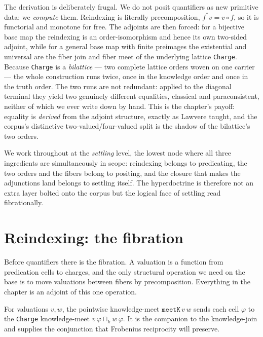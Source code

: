 The derivation is deliberately frugal. We do not posit quantifiers as new
primitive data; we \emph{compute} them. Reindexing is literally precomposition,
$f^{*}v = v \circ f$, so it is functorial and monotone for free. The adjoints are
then forced: for a bijective base map the reindexing is an order-isomorphism and
hence its own two-sided adjoint, while for a general base map with finite
preimages the existential and universal are the fiber join and fiber meet of the
underlying lattice \texttt{Charge}. Because \texttt{Charge} is a \emph{bilattice}
--- two complete lattice orders woven on one carrier --- the whole construction
runs twice, once in the knowledge order and once in the truth order. The two runs
are not redundant: applied to the diagonal terminal they yield two genuinely
different equalities, classical and paraconsistent, neither of which we ever
write down by hand. This is the chapter's payoff: equality is \emph{derived} from
the adjoint structure, exactly as Lawvere taught, and the corpus's distinctive
two-valued/four-valued split is the shadow of the bilattice's two orders.

We work throughout at the \emph{settling} level, the lowest node where all three
ingredients are simultaneously in scope: reindexing belongs to predicating, the
two orders and the fibers belong to positing, and the closure that makes the
adjunctions land belongs to settling itself. The hyperdoctrine is therefore not
an extra layer bolted onto the corpus but the logical face of settling read
fibrationally.

\section{Reindexing: the fibration}

Before quantifiers there is the fibration. A valuation is a function from
predication cells to charges, and the only structural operation we need on the
base is to move valuations between fibers by precomposition. Everything in the
chapter is an adjoint of this one operation.

\begin{definition}\label{def:valuation-meetK}\leanok{}
For valuations $v, w$, the pointwise knowledge-meet $\texttt{meetK}\,v\,w$ sends
each cell $\varphi$ to the \texttt{Charge} knowledge-meet $v\,\varphi \sqcap_k
w\,\varphi$. It is the companion to the knowledge-join and supplies the
conjunction that Frobenius reciprocity will preserve.
\end{definition}

